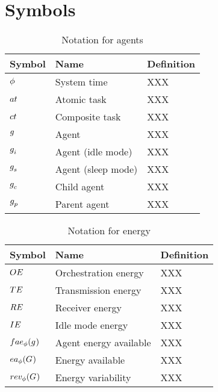 \section{Symbols}

\begin{table}[pos=htp]
	\begin{tabular}{|p{}|p{}|p{}|}
		\hline
		Symbol & Name & Definition \\
		\hline
		$\phi$ & System time & XXX \\
		$\varAtomicTask{}{}$ & Atomic task & XXX \\
		$\varCompositeTask{}{}$ & Composite task & XXX \\
		$g_{}^{}$ & Agent & XXX \\
		$g_{i}^{}$ & Agent (idle mode) & XXX \\
		$g_{s}^{}$ & Agent (sleep mode) & XXX \\
		$g_{c}^{}$ & Child agent & XXX \\
		$g_{p}^{}$ & Parent agent & XXX \\
		\hline
	\end{tabular}
	\caption{Notation for agents}
\end{table}

\begin{table}[pos=htp]
	\begin{tabular}{|p{}|p{}|p{}|}
		\hline
		Symbol & Name & Definition \\
		\hline
		$OE$ & Orchestration energy & XXX \\
		$TE$ & Transmission energy & XXX \\
		$RE$ & Receiver energy & XXX \\
		$IE$ & Idle mode energy & XXX \\
		$\functionAgentEnergyAvailable{}{}$ & Agent energy available & XXX \\
		$\functionEnergyAvailable{}{}$ & Energy available & XXX \\
		$\functionEnergyVariability{}{}$ & Energy variability& XXX \\
		\hline
	\end{tabular}
	\caption{Notation for energy}
\end{table}

